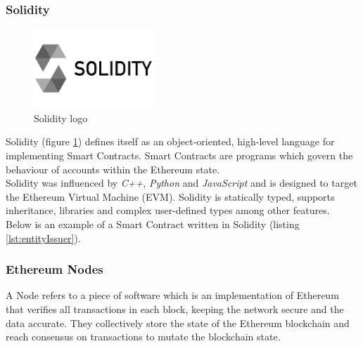 \documentclass[a4paper, 12pt]{article} %
\begin{document}
        \subsubsection{Solidity}
            \begin{figure}[h]
                \centering
                \includegraphics[width=0.4\textwidth]{solidity-logo.jpg}
                \caption{Solidity logo}
                \label{fig:solidity_logo}
            \end{figure}
            
            Solidity (figure \ref{fig:solidity_logo}) defines itself as an object-oriented, high-level language for implementing Smart Contracts. Smart Contracts are programs which govern the behaviour of accounts within the Ethereum state.\\
            
            Solidity\cite{solidityGit} was influenced by \textit{C++}, \textit{Python} and \textit{JavaScript} and is designed to target the Ethereum Virtual Machine (EVM). Solidity is statically typed, supports inheritance, libraries and complex user-defined types among other features.\\

            Below is an example of a Smart Contract written in Solidity (listing  \ref{lst:entityIssuer}).
            
            
            
            
        \subsubsection{Ethereum Nodes}
            A Node refers to a piece of software which is an implementation of Ethereum that verifies all transactions in each block, keeping the network secure and the data accurate. They collectively store the state of the Ethereum blockchain and reach consensus on transactions to mutate the blockchain state.\\
            
\end{document}
